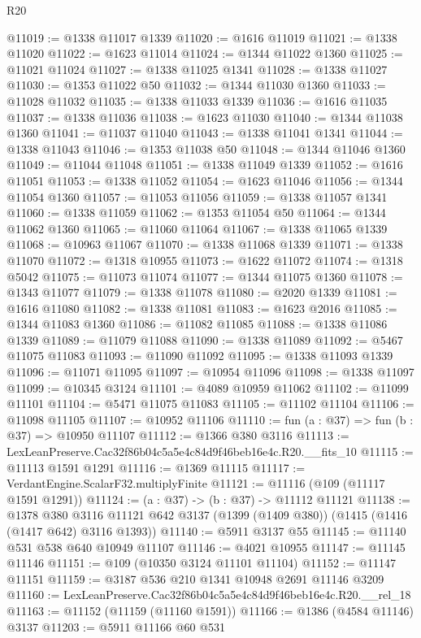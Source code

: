 \begin{lexlean}{R20}
\begin{coremodule}
@11019 := @1338 @11017 @1339
@11020 := @1616 @11019
@11021 := @1338 @11020
@11022 := @1623 @11014
@11024 := @1344 @11022 @1360
@11025 := @11021 @11024
@11027 := @1338 @11025 @1341
@11028 := @1338 @11027
@11030 := @1353 @11022 @50
@11032 := @1344 @11030 @1360
@11033 := @11028 @11032
@11035 := @1338 @11033 @1339
@11036 := @1616 @11035
@11037 := @1338 @11036
@11038 := @1623 @11030
@11040 := @1344 @11038 @1360
@11041 := @11037 @11040
@11043 := @1338 @11041 @1341
@11044 := @1338 @11043
@11046 := @1353 @11038 @50
@11048 := @1344 @11046 @1360
@11049 := @11044 @11048
@11051 := @1338 @11049 @1339
@11052 := @1616 @11051
@11053 := @1338 @11052
@11054 := @1623 @11046
@11056 := @1344 @11054 @1360
@11057 := @11053 @11056
@11059 := @1338 @11057 @1341
@11060 := @1338 @11059
@11062 := @1353 @11054 @50
@11064 := @1344 @11062 @1360
@11065 := @11060 @11064
@11067 := @1338 @11065 @1339
@11068 := @10963 @11067
@11070 := @1338 @11068 @1339
@11071 := @1338 @11070
@11072 := @1318 @10955
@11073 := @1622 @11072
@11074 := @1318 @5042
@11075 := @11073 @11074
@11077 := @1344 @11075 @1360
@11078 := @1343 @11077
@11079 := @1338 @11078
@11080 := @2020 @1339
@11081 := @1616 @11080
@11082 := @1338 @11081
@11083 := @1623 @2016
@11085 := @1344 @11083 @1360
@11086 := @11082 @11085
@11088 := @1338 @11086 @1339
@11089 := @11079 @11088
@11090 := @1338 @11089
@11092 := @5467 @11075 @11083
@11093 := @11090 @11092
@11095 := @1338 @11093 @1339
@11096 := @11071 @11095
@11097 := @10954 @11096
@11098 := @1338 @11097
@11099 := @10345 @3124
@11101 := @4089 @10959 @11062
@11102 := @11099 @11101
@11104 := @5471 @11075 @11083
@11105 := @11102 @11104
@11106 := @11098 @11105
@11107 := @10952 @11106
@11110 := fun (a : @37) => fun (b : @37) => @10950 @11107
@11112 := @1366 @380 @3116
@11113 := LexLeanPreserve.Cac32f86b04c5a5e4c84d9f46beb16e4c.R20.__fits_10
@11115 := @11113 @1591 @1291
@11116 := @1369 @11115
@11117 := VerdantEngine.ScalarF32.multiplyFinite
@11121 := @11116 (@109 (@11117 @1591 @1291))
@11124 := (a : @37) -> (b : @37) -> @11112 @11121
@11138 := @1378
    @380
    @3116
    @11121
    @642
    @3137
    (@1399 (@1409 @380))
    (@1415 (@1416 (@1417 @642) @3116 @1393))
@11140 := @5911 @3137 @55
@11145 := @11140 @531 @538 @640 @10949 @11107
@11146 := @4021 @10955
@11147 := @11145 @11146
@11151 := @109 (@10350 @3124 @11101 @11104)
@11152 := @11147 @11151
@11159 := @3187 @536 @210 @1341 @10948 @2691 @11146 @3209
@11160 := LexLeanPreserve.Cac32f86b04c5a5e4c84d9f46beb16e4c.R20.__rel_18
@11163 := @11152 (@11159 (@11160 @1591))
@11166 := @1386 (@4584 @11146) @3137
@11203 := @5911
    @11166
    @60
    @531

\end{coremodule}
\end{lexlean}
